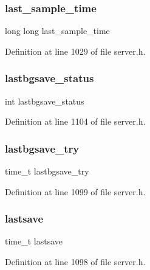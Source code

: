 \subsubsection{\texorpdfstring{last\+\_\+sample\+\_\+time}{last\_sample\_time}}
{\footnotesize\ttfamily long long last\+\_\+sample\+\_\+time}



Definition at line 1029 of file server.\+h.

\mbox{\label{structredis_server_a3171edf0e16ac5d2f1284e46c20762a3}} 
\subsubsection{\texorpdfstring{lastbgsave\+\_\+status}{lastbgsave\_status}}
{\footnotesize\ttfamily int lastbgsave\+\_\+status}



Definition at line 1104 of file server.\+h.

\mbox{\label{structredis_server_ab23a754e7d3bd832810530b360eabd91}} 
\subsubsection{\texorpdfstring{lastbgsave\+\_\+try}{lastbgsave\_try}}
{\footnotesize\ttfamily time\+\_\+t lastbgsave\+\_\+try}



Definition at line 1099 of file server.\+h.

\mbox{\label{structredis_server_ae08caa5f869e19e94cd95d1a2edea4b2}} 
\subsubsection{\texorpdfstring{lastsave}{lastsave}}
{\footnotesize\ttfamily time\+\_\+t lastsave}



Definition at line 1098 of file server.\+h.

